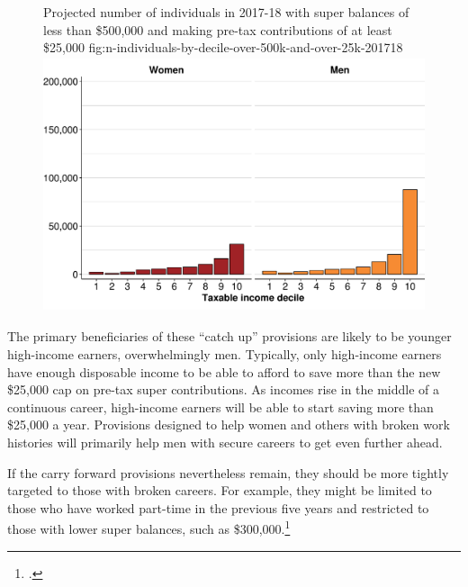 \documentclass[continuous]{grattan}\usepackage[]{graphicx}\usepackage[]{color}
\newenvironment{knitrout}{}{} %
\begin{document}
\begin{figure}%
%
{Projected number of individuals in 2017-18 with super balances of less than \$500,000 and making pre-tax contributions of at least \$25,000}%
{fig:n-individuals-by-decile-over-500k-and-over-25k-201718}
\begin{knitrout}
\color{fgcolor}
\includegraphics[width=4.47222in,height=2.94759954545455in]{atlas/n-individuals-by-decile-over-500k-and-over-25k-201718-1} 

\end{knitrout}
\end{figure}

The primary beneficiaries of these “catch up” provisions are likely to be younger high-income earners, overwhelmingly men. 
Typically, only high-income earners have enough disposable income to be able to afford to save more than the new \$25,000 cap on pre-tax super contributions. 
As incomes rise in the middle of a continuous career, high-income earners will be able to start saving more than \$25,000 a year. 
Provisions designed to help women and others with broken work histories will primarily help men with secure careers to get even further ahead. 

If the carry forward provisions nevertheless remain, they should be more tightly targeted to those with broken careers. For example, they might be limited to those who have worked part-time in the previous five years and restricted to those with lower super balances, such as \$300,000.\footcite{DaleyCoates2016-theConvo-Super-changes-could-benefit-rich} %
\end{document}
